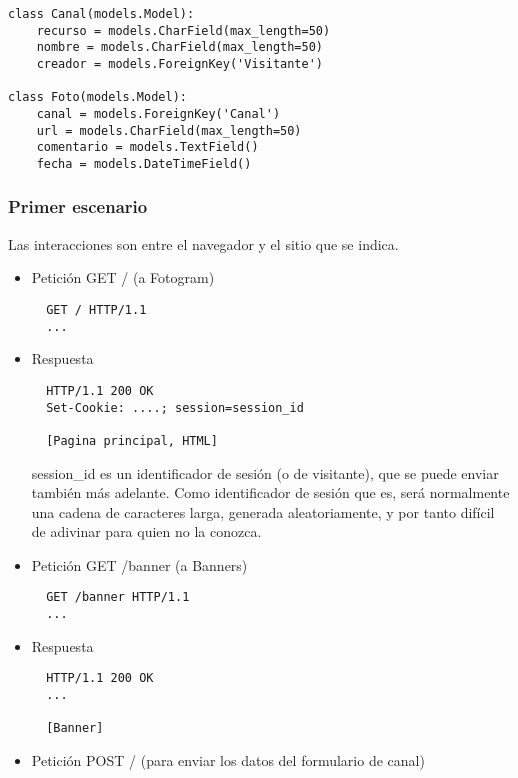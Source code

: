 {\begin{verbatim}
class Canal(models.Model):
    recurso = models.CharField(max_length=50)
    nombre = models.CharField(max_length=50)
    creador = models.ForeignKey('Visitante')

class Foto(models.Model):
    canal = models.ForeignKey('Canal')
    url = models.CharField(max_length=50)
    comentario = models.TextField()
    fecha = models.DateTimeField()
\end{verbatim}


\subsubsection*{Primer escenario}

Las interacciones son entre el navegador y el sitio que se indica.

\begin{itemize}
\item Petición GET / (a Fotogram)

\begin{verbatim}
  GET / HTTP/1.1
  ...
\end{verbatim}

\item Respuesta

\begin{verbatim}
  HTTP/1.1 200 OK
  Set-Cookie: ....; session=session_id

  [Pagina principal, HTML]
\end{verbatim}

session\_id es un identificador de sesión (o de visitante), que se puede enviar también más adelante. Como identificador de sesión que es, será normalmente una cadena de caracteres larga, generada aleatoriamente, y por tanto difícil de adivinar para quien no la conozca.

\item Petición GET /banner (a Banners)

\begin{verbatim}
  GET /banner HTTP/1.1
  ...
\end{verbatim}

\item Respuesta

\begin{verbatim}
  HTTP/1.1 200 OK
  ...

  [Banner]
\end{verbatim}

\item Petición POST / (para enviar los datos del formulario de canal)


\end{itemize}}
